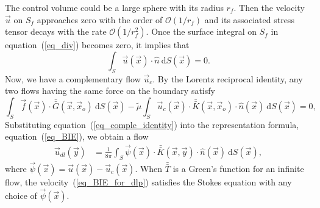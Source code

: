 The control volume could be a large sphere with its radius $r_f$. Then the velocity $\vec{u}$ on $S_f$ approaches zero with the order of $\mathcal{O}(1/r_f)$ and its associated stress tensor decays with the rate $\mathcal{O} (1/r_f^2)$. Once the surface integral on $S_f$ in equation~(\ref{eq_div}) becomes zero, it implies that
\[
\int_{S} \vec{u}(\vec{x}) \cdot \hat{n} \ \text{d}S(\vec{x}) = 0.
\]
Now, we have a complementary flow $\vec{u}_c$.  By the Lorentz reciprocal identity, any two flows having the same force on the boundary satisfy
\begin{equation}
	\int_{S}  \vec{f}(\vec{x}) \cdot \bar{\bar{G}}(\vec{x},\vec{x}_o) \ \text{d}S(\vec{x})  
	- \tilde{\mu} \int_S
	  \vec{u}_c(\vec{x}) \cdot  \bar{\bar{K}}(\vec{x},\vec{x}_o) 
	  \cdot \hat{n} ( \vec{x})
	  \ \text{d}S(\vec{x})
	  =0,
	  \label{eq_comple_identity}
\end{equation}
Substituting equation~(\ref{eq_comple_identity}) into the representation formula, equation~(\ref{eq_BIE}), we obtain a flow
\begin{align}
   \vec{u}_{dl}(\vec{y}) & =
	\frac{1}{8 \pi } \int_S  
	\vec{\psi}(\vec{x})
	\cdot  \bar{\bar{K}}(\vec{x},\vec{y})  
	\cdot \hat{n} ( \vec{x})
	\ \text{d}S(\vec{x}),
\label{eq_BIE_for_dlp}
\end{align}
where $
	\vec{\psi}(\vec{x}) =    \vec{u}(\vec{x})  - \vec{u}_c (\vec{x})$.
When $\bar{\bar{T }}$ is a Green's function for an infinite flow, the velocity~(\ref{eq_BIE_for_dlp}) satisfies the Stokes equation with any choice of $\vec{\psi}(\vec{x}) $.
\par

